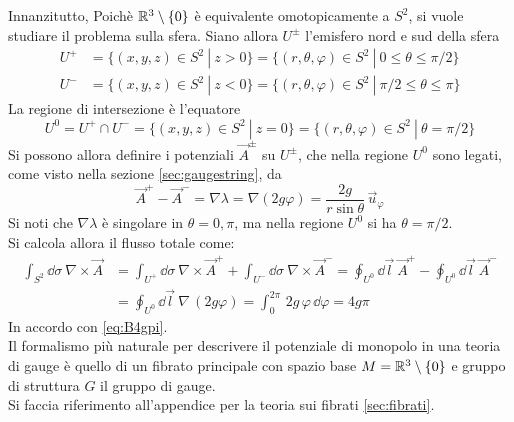 Innanzitutto, Poichè $\mathbb{R}^3 \setminus \{0\}$ è equivalente omotopicamente
a $S^2$, si vuole studiare il problema sulla sfera. Siano allora $U^\pm$ l'emisfero
nord e sud della sfera
\begin{equation}\label{eq:U+U-}
   \begin{aligned}
      U^+ &= \{(x,y,z) \in S^2 \: | \: z > 0 \}
          = \{(r,\theta,\varphi ) \in S^2 \: | \: 0 \leq \theta \leq \pi/2 \} \\
      U^- &= \{(x,y,z) \in S^2 \: | \: z < 0 \}
          = \{(r,\theta,\varphi ) \in S^2 \: | \: \pi/2 \leq \theta \leq \pi \}
   \end{aligned}
\end{equation}
La regione di intersezione è l'equatore
\begin{equation*}
   U^0 = U^+ \cap U^- = \{(x,y,z) \in S^2 \: | \: z = 0 \}
       = \{(r,\theta,\varphi ) \in S^2 \: | \: \theta = \pi/2 \}
\end{equation*}
Si possono allora definire i potenziali $\vec A^\pm$ su $U^\pm$, che nella regione
$U^0$ sono legati, come visto nella sezione \ref{sec:gaugestring}, da
$$
   \vec A ^+ - \vec A^- = \nabla \lambda = \nabla (2g\varphi ) = \frac{2g}{r\sin\theta} \, \vec u _\varphi
$$
Si noti che $\nabla \lambda$ è singolare in $\theta = 0,\pi$, ma nella regione $U^0$
si ha $\theta = \pi/2$.\\
Si calcola allora il flusso totale come:
\begin{equation*}
   \begin{aligned}
      \int_{S^2} \dd \sigma \: \nabla \times \vec A & =
         \int_{U^+} \dd \sigma \: \nabla \times \vec A^+ +
         \int_{U^-} \dd \sigma \: \nabla \times \vec A^-
        = \oint_{U^0} \dd \vec l \: \vec A^+ -
          \oint_{U^0} \dd \vec l \: \vec A^- \\
      & = \oint_{U^0} \dd \vec l \: \nabla \, (2g\varphi )
        = \int_0^{2\pi} \, 2g \, \varphi  \, \dd \varphi
        = 4g\pi
   \end{aligned}
\end{equation*}
In accordo con \ref{eq:B4gpi}.\\

Il formalismo più naturale per descrivere il potenziale di monopolo in una teoria
di gauge è quello di un fibrato principale con spazio base $M = \mathbb{R}^3
\setminus \{0\}$ e gruppo di struttura $G$ il gruppo di gauge.\\
Si faccia riferimento all'appendice per la teoria sui fibrati \ref{sec:fibrati}.

